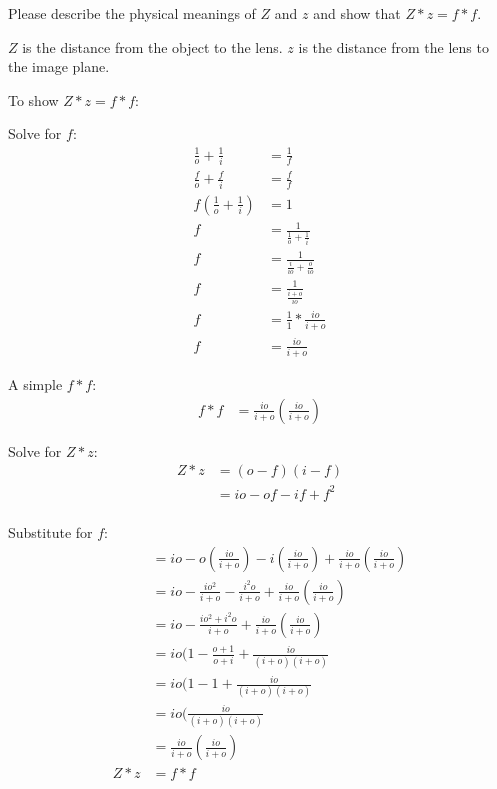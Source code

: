 \documentclass{jhwhw}
\begin{document}
Please describe the physical meanings of $Z$ and $z$ and show that $Z * z = f * f$.

\solution
$Z$ is the distance from the object to the lens.
$z$ is the distance from the lens to the image plane.

To show $Z * z = f * f$:

Solve for $f$:
\begin{align*}
\frac{1}{o} + \frac{1}{i} &= \frac{1}{f}\\
\frac{f}{o} + \frac{f}{i} &= \frac{f}{f}\\
f(\frac{1}{o} + \frac{1}{i}) &= 1\\
f &= \frac{1}{\frac{1}{o} + \frac{1}{i}}\\
f &= \frac{1}{\frac{i}{io} + \frac{o}{io}}\\
f &= \frac{1}{\frac{i + o}{io}}\\
f &= \frac{1}{1} * \frac{io}{i + o}\\
f &= \frac{io}{i + o}
\end{align*}

A simple $f*f$:
\begin{align*}
f * f &= \frac{io}{i + o} (\frac{io}{i + o})
\end{align*}

Solve for $Z * z$:
\begin{align*}
Z * z &= (o - f)(i - f)\\
&= io - of - if + f^{2}\\
\end{align*}

Substitute for $f$:
\begin{align*}
&= io - o(\frac{io}{i + o}) - i(\frac{io}{i + o}) + \frac{io}{i + o} (\frac{io}{i + o})\\
&= io - \frac{io^{2}}{i + o} - \frac{i^{2}o}{i + o} + \frac{io}{i + o} (\frac{io}{i + o})\\
&= io - \frac{io^{2} + i^{2}o}{i + o} + \frac{io}{i + o} (\frac{io}{i + o})\\
&= io(1 - \frac{o + 1}{o + i} + \frac{io}{(i + o)(i + o)}\\
&= io(1 - 1 + \frac{io}{(i + o)(i + o)}\\
&= io(\frac{io}{(i + o)(i + o)}\\
&= \frac{io}{i + o}(\frac{io}{i + o})\\
Z * z &= f * f
\end{align*}
\end{document}
